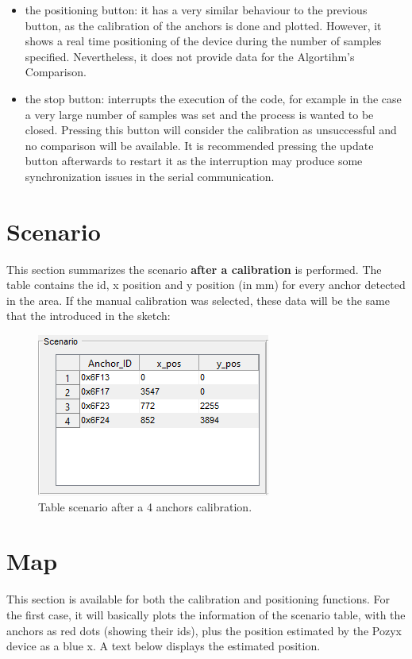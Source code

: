 \documentclass[a4paper, 21pt]{article} %
\begin{document}
\begin{itemize}
\item the positioning button: it has a very similar behaviour to the previous button, as the calibration of the anchors is done and plotted. However, it shows a real time positioning of the device during the number of samples specified. Nevertheless, it does not provide data for the Algortihm's Comparison.
\item the stop button: interrupts the execution of the code, for example in the case a very large number of samples was set and the process is wanted to be closed. Pressing this button will consider the calibration as unsuccessful and no comparison will be available. It is recommended pressing the update button afterwards to restart it as the interruption may produce some synchronization issues in the serial communication.
\end{itemize}


\section{Scenario}\label{se:sc}
This section summarizes the scenario \textbf{after a calibration} is performed. The table contains the id, x position and y position (in mm) for every anchor detected in the area. If the manual calibration was selected, these data will be the same that the introduced in the sketch:
\begin{figure}[H]
\begin{center}
\includegraphics[scale=1.2]{fig/ss_sc.png}
\end{center}
\caption{Table scenario after a 4 anchors calibration.}
\end{figure}

\section{Map}
This section is available for both the calibration and positioning functions. For the first case, it will basically plots the information of the scenario table, with the anchors as red dots (showing their ids), plus the position estimated by the Pozyx device as a blue x. A text below displays the estimated position.\\
\end{document}
